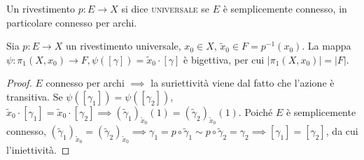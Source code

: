 \begin{defn}
  Un rivestimento $p:E \longrightarrow X$ si dice \textsc{universale} se $E$ è semplicemente connesso, in particolare connesso per archi.
\end{defn}

\begin{prop}
  Sia $p:E \longrightarrow X$ un rivestimento universale, $x_0 \in X$, $\tilde{x}_0 \in F=p^{-1}(x_0)$. La mappa $\psi:\pi_1(X, x_0) \longrightarrow F, \psi([\gamma])=\tilde{x}_0 \cdot [\gamma]$ è bigettiva, per cui $|\pi_1(X, x_0)|=|F|$.
\end{prop}

\begin{proof}
  $E$ connesso per archi $\implies$ la suriettività viene dal fatto che l'azione è transitiva.
  Se $\psi([\gamma_1])=\psi([\gamma_2])$, $\tilde{x}_0 \cdot [\gamma_1]=\tilde{x}_0 \cdot [\gamma_2] \implies (\tilde{\gamma}_1)_{\tilde{x}_0}(1)=(\tilde{\gamma}_2)_{\tilde{x}_0}(1)$.
  Poiché $E$ è semplicemente connesso, $(\tilde{\gamma}_1)_{\tilde{x}_0}=(\tilde{\gamma}_2)_{\tilde{x}_0} \implies \gamma_1=p \circ \tilde{\gamma}_1 \sim p \circ \tilde{\gamma}_2=\gamma_2 \implies [\gamma_1]=[\gamma_2]$, da cui l'iniettività.
\end{proof}
